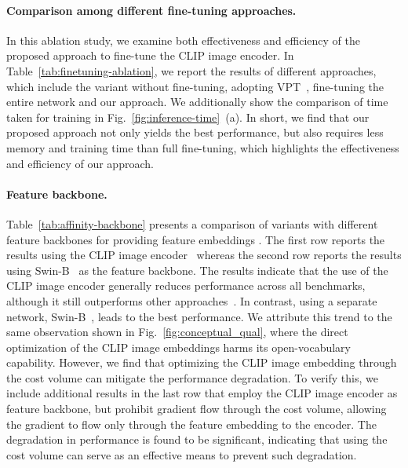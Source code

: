 \documentclass[10pt,twocolumn,letterpaper]{article}
\begin{document}
\vspace{-10pt}
\label{finetune}
\paragraph{Comparison among different fine-tuning approaches.}
In this ablation study, we examine both effectiveness and efficiency of the proposed approach to fine-tune the CLIP image encoder. In Table~\ref{tab:finetuning-ablation}, we report the results of different approaches, which include the variant without fine-tuning, adopting VPT~\cite{jia2022visual}, fine-tuning the entire network and our approach. We additionally show the comparison of time taken for training in Fig.~\ref{fig:inference-time}~(a). In short, we find that our proposed approach not only yields the best performance, but also requires less memory and training time than full fine-tuning, which highlights the effectiveness and efficiency of our approach.


\vspace{-10pt}
\paragraph{Feature backbone.}
Table~\ref{tab:affinity-backbone} presents a comparison of variants with different feature backbones for providing feature embeddings . The first row reports the results using the CLIP image encoder~\cite{radford2021learning} whereas the second row reports the results using Swin-B~\cite{liu2021swin} as the feature backbone. The results indicate that the use of the CLIP image encoder generally reduces performance across all benchmarks, although it still outperforms other approaches~\cite{li2022language,xu2022simple, ding2022decoupling, liang2022open, ghiasi2022scaling}. In contrast, using a separate network, Swin-B~\cite{liu2021swin}, leads to the best performance. We attribute this trend to the same observation shown in Fig.~\ref{fig:conceptual_qual}, where the direct optimization of the CLIP image embeddings harms its open-vocabulary capability. However, we find that optimizing the CLIP image embedding through the cost volume can mitigate the performance degradation. To verify this, we include additional results in the last row that employ the CLIP image encoder as feature backbone, but prohibit gradient flow through the cost volume, allowing the gradient to flow only through the feature embedding to the encoder. The degradation in performance is found to be significant, indicating that using the cost volume can serve as an effective means to prevent such degradation.
\end{document}
